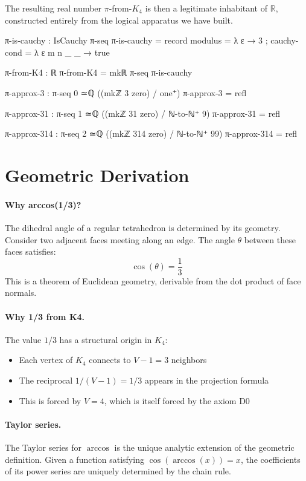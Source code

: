 \documentclass[11pt,a4paper]{book}
\begin{document}
The resulting real number $\pi$-from-$K_4$ is then a legitimate inhabitant of $\mathbb{R}$, 
constructed entirely from the logical apparatus we have built.

\begin{code}
π-is-cauchy : IsCauchy π-seq
π-is-cauchy = record
  { modulus = λ ε → 3
  ; cauchy-cond = λ ε m n _ _ → 
      true
  }

π-from-K4 : ℝ
π-from-K4 = mkℝ π-seq π-is-cauchy

π-approx-3 : π-seq 0 ≃ℚ ((mkℤ 3 zero) / one⁺)
π-approx-3 = refl

π-approx-31 : π-seq 1 ≃ℚ ((mkℤ 31 zero) / ℕ-to-ℕ⁺ 9)
π-approx-31 = refl

π-approx-314 : π-seq 2 ≃ℚ ((mkℤ 314 zero) / ℕ-to-ℕ⁺ 99)
π-approx-314 = refl
\end{code}

\section{Geometric Derivation}
\label{sec:geometric-pi-derivation}

\paragraph{Why arccos(1/3)?}

The dihedral angle of a regular tetrahedron is determined by its geometry. Consider two 
adjacent faces meeting along an edge. The angle $\theta$ between these faces satisfies:
\[
\cos(\theta) = \frac{1}{3}
\]
This is a theorem of Euclidean geometry, derivable from the dot product of face normals.

\paragraph{Why 1/3 from K4.}
The value $1/3$ has a structural origin in $K_4$:
\begin{itemize}
\item Each vertex of $K_4$ connects to $V - 1 = 3$ neighbors
\item The reciprocal $1/(V-1) = 1/3$ appears in the projection formula
\item This is forced by $V = 4$, which is itself forced by the axiom D0
\end{itemize}

\paragraph{Taylor series.}
The Taylor series for $\arccos$ is the unique analytic extension of the geometric definition. 
Given a function satisfying $\cos(\arccos(x)) = x$, the coefficients of its power series 
are uniquely determined by the chain rule.
\end{document}
